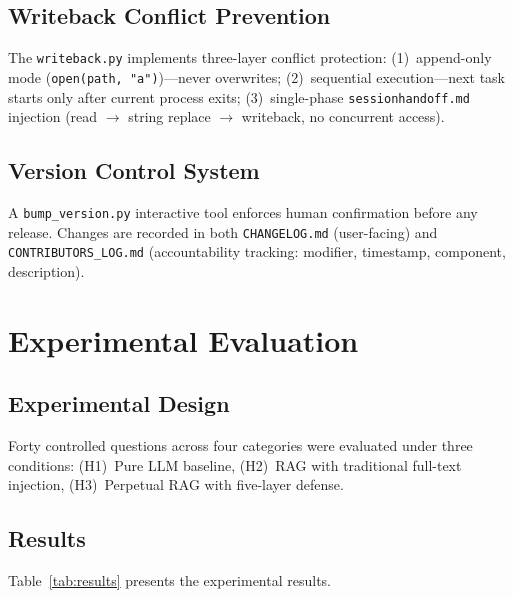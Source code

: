 \documentclass[conference]{IEEEtran}
\begin{document}
\subsection{Writeback Conflict Prevention}

The \texttt{writeback.py} implements three-layer conflict protection:
(1)~append-only mode (\texttt{open(path,\,"a")})---never overwrites;
(2)~sequential execution---next task starts only after current process exits;
(3)~single-phase \texttt{sessionhandoff.md} injection (read $\to$ string
replace $\to$ writeback, no concurrent access).

\subsection{Version Control System}

A \texttt{bump\_version.py} interactive tool enforces human confirmation
before any release. Changes are recorded in both \texttt{CHANGELOG.md}
(user-facing) and \texttt{CONTRIBUTORS\_LOG.md} (accountability tracking:
modifier, timestamp, component, description).

\section{Experimental Evaluation}

\subsection{Experimental Design}

Forty controlled questions across four categories were evaluated under three
conditions: (H1)~Pure LLM baseline, (H2)~RAG with traditional full-text
injection, (H3)~Perpetual RAG with five-layer defense.

\subsection{Results}

Table~\ref{tab:results} presents the experimental results.
\end{document}
